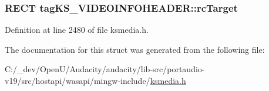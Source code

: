 \subsubsection[{\texorpdfstring{rc\+Target}{rcTarget}}]{\setlength{\rightskip}{0pt plus 5cm}R\+E\+CT tag\+K\+S\+\_\+\+V\+I\+D\+E\+O\+I\+N\+F\+O\+H\+E\+A\+D\+E\+R\+::rc\+Target}\hypertarget{structtag_k_s___v_i_d_e_o_i_n_f_o_h_e_a_d_e_r_a6b8f59c5c1feb9ac4963951800095fbc}{}\label{structtag_k_s___v_i_d_e_o_i_n_f_o_h_e_a_d_e_r_a6b8f59c5c1feb9ac4963951800095fbc}


Definition at line 2480 of file ksmedia.\+h.



The documentation for this struct was generated from the following file\+:\begin{DoxyCompactItemize}
\item 
C\+:/\+\_\+dev/\+Open\+U/\+Audacity/audacity/lib-\/src/portaudio-\/v19/src/hostapi/wasapi/mingw-\/include/\hyperlink{ksmedia_8h}{ksmedia.\+h}\end{DoxyCompactItemize}
